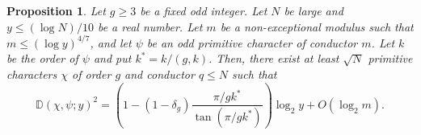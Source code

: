\documentclass[12pt]{amsart}
\newtheorem{thm}{Theorem}[section]
\newtheorem{pro}[thm]{Proposition}
\theoremstyle{definition}
\numberwithin{equation}{section}
\newcommand{\mb}{\mathbb}
\begin{document}
\begin{pro} \label{UPPER}
Let $g\geq 3$ be a fixed odd integer. Let $N$ be large and $y\leq (\log N)/10$ be a real number. Let $m$ be a non-exceptional modulus such that $m\leq (\log y)^{4/7}$, and let $\psi$ be an odd primitive character of conductor $m$. Let $k$ be the order of $\psi$ and  put $k^{\ast}=k/(g,k)$.  Then, there exist at least $\sqrt{N}$ primitive characters $\chi$ of order $g$ and conductor $q\leq N$ such that
\begin{equation} \label{OPT}
\mb{D}(\chi,\psi;y)^2 =  \left(1-(1-\delta_g)\frac{\pi/gk^{\ast}}{\tan(\pi/gk^{\ast})}\right) \log_2y + O\left(\log_2 m\right).
\end{equation}
\end{pro}
\end{document}
